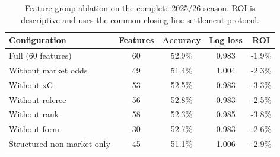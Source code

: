 \begin{table}[tbp]
\centering
\small
\setlength{\tabcolsep}{5pt}
\caption{Feature-group ablation on the complete 2025/26 season. ROI is descriptive and uses the common closing-line settlement protocol.}
\label{tab:ablation}
\begin{tabular}{lcccc}
\toprule
Configuration & Features & Accuracy & Log loss & ROI \\
\midrule
Full (60 features) & 60 & 52.9\% & 0.983 & -1.9\% \\
Without market odds & 49 & 51.4\% & 1.004 & -2.3\% \\
Without xG & 53 & 52.5\% & 0.983 & -3.3\% \\
Without referee & 56 & 52.8\% & 0.983 & -2.5\% \\
Without rank & 58 & 52.3\% & 0.985 & -3.8\% \\
Without form & 30 & 52.7\% & 0.983 & -2.6\% \\
Structured non-market only & 45 & 51.1\% & 1.006 & -2.9\% \\
\bottomrule
\end{tabular}
\end{table}
